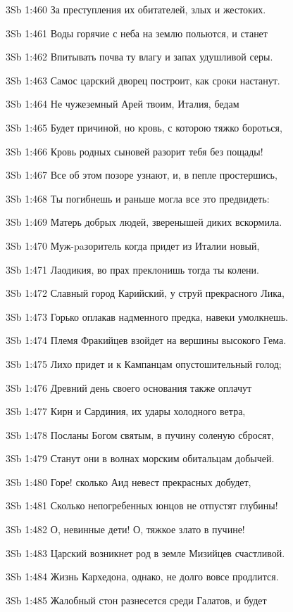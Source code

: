 \vs 3Sb 1:460 За преступления их обитателей, злых и жестоких. 

\vs 3Sb 1:461 Воды горячие с неба на землю польются, и станет 

\vs 3Sb 1:462 Впитывать почва ту влагу и запах удушливой серы.

\vs 3Sb 1:463 Самос царский дворец построит, как сроки настанут.

\vs 3Sb 1:464 Не чужеземный Арей твоим, Италия, бедам 

\vs 3Sb 1:465 Будет причиной, но кровь, с которою тяжко бороться, 

\vs 3Sb 1:466 Кровь родных сыновей разорит тебя без пощады! 

\vs 3Sb 1:467 Все об этом позоре узнают, и, в пепле простершись, 

\vs 3Sb 1:468 Ты погибнешь  и раньше могла все это предвидеть: 

\vs 3Sb 1:469 Матерь добрых людей, зверенышей диких вскормила.

\vs 3Sb 1:470 Муж-paзоритель когда придет из Италии новый, 

\vs 3Sb 1:471 Лаодикия, во прах преклонишь тогда ты колени. 

\vs 3Sb 1:472 Славный город Карийский, у струй прекрасного Лика, 

\vs 3Sb 1:473 Горько оплакав надменного предка, навеки умолкнешь.

\vs 3Sb 1:474 Племя Фракийцев взойдет на вершины высокого Гема.

\vs 3Sb 1:475 Лихо придет и к Кампанцам  опустошительный голод; 

\vs 3Sb 1:476 Древний день своего основания также оплачут 

\vs 3Sb 1:477 Кирн и Сардиния, их удары холодного ветра, 

\vs 3Sb 1:478 Посланы Богом святым, в пучину соленую сбросят, 

\vs 3Sb 1:479 Станут они в волнах морским обитальцам добычей.

\vs 3Sb 1:480 Горе! сколько Аид невест прекрасных добудет,

\vs 3Sb 1:481 Сколько непогребенных юнцов не отпустят глубины! 

\vs 3Sb 1:482 О, невинные дети! О, тяжкое злато в пучине!

\vs 3Sb 1:483 Царский возникнет род в земле Мизийцев счастливой.

\vs 3Sb 1:484 Жизнь Кархедона, однако, не долго вовсе продлится. 

\vs 3Sb 1:485 Жалобный стон разнесется среди Галатов, и будет 

